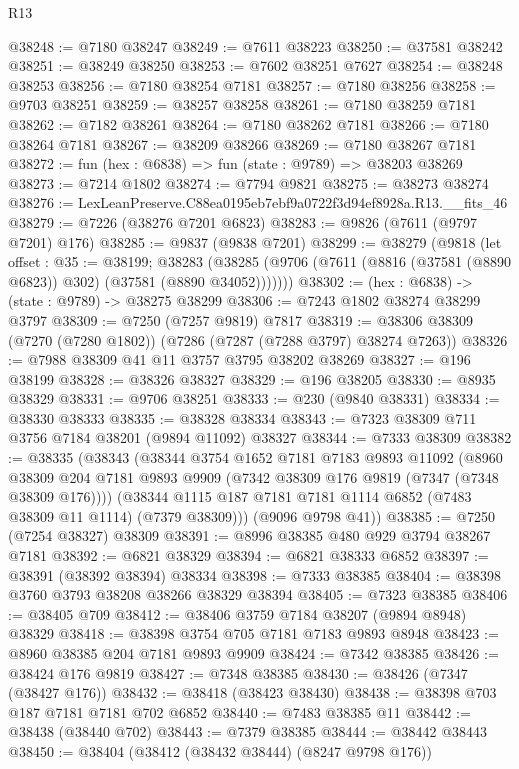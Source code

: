 \begin{lexlean}{R13}
\begin{coremodule}
@38248 := @7180 @38247
@38249 := @7611 @38223
@38250 := @37581 @38242
@38251 := @38249 @38250
@38253 := @7602 @38251 @7627
@38254 := @38248 @38253
@38256 := @7180 @38254 @7181
@38257 := @7180 @38256
@38258 := @9703 @38251
@38259 := @38257 @38258
@38261 := @7180 @38259 @7181
@38262 := @7182 @38261
@38264 := @7180 @38262 @7181
@38266 := @7180 @38264 @7181
@38267 := @38209 @38266
@38269 := @7180 @38267 @7181
@38272 := fun (hex : @6838) => fun (state : @9789) => @38203 @38269
@38273 := @7214 @1802
@38274 := @7794 @9821
@38275 := @38273 @38274
@38276 := LexLeanPreserve.C88ea0195eb7ebf9a0722f3d94ef8928a.R13.__fits_46
@38279 := @7226 (@38276 @7201 @6823)
@38283 := @9826 (@7611 (@9797 @7201) @176)
@38285 := @9837 (@9838 @7201)
@38299 := @38279
    (@9818
      (let offset : @35 := @38199;
      @38283 (@38285 (@9706 (@7611 (@8816 (@37581 (@8890 @6823)) @302) (@37581 (@8890 @34052)))))))
@38302 := (hex : @6838) -> (state : @9789) -> @38275 @38299
@38306 := @7243 @1802 @38274 @38299 @3797
@38309 := @7250 (@7257 @9819) @7817
@38319 := @38306 @38309 (@7270 (@7280 @1802)) (@7286 (@7287 (@7288 @3797) @38274 @7263))
@38326 := @7988 @38309 @41 @11 @3757 @3795 @38202 @38269
@38327 := @196 @38199
@38328 := @38326 @38327
@38329 := @196 @38205
@38330 := @8935 @38329
@38331 := @9706 @38251
@38333 := @230 (@9840 @38331)
@38334 := @38330 @38333
@38335 := @38328 @38334
@38343 := @7323 @38309 @711 @3756 @7184 @38201 (@9894 @11092) @38327
@38344 := @7333 @38309
@38382 := @38335
    (@38343
      (@38344
        @3754
        @1652
        @7181
        @7183
        @9893
        @11092
        (@8960 @38309 @204 @7181 @9893 @9909 (@7342 @38309 @176 @9819 (@7347 (@7348 @38309 @176))))
        (@38344 @1115 @187 @7181 @7181 @1114 @6852 (@7483 @38309 @11 @1114) (@7379 @38309)))
      (@9096 @9798 @41))
@38385 := @7250 (@7254 @38327) @38309
@38391 := @8996 @38385 @480 @929 @3794 @38267 @7181
@38392 := @6821 @38329
@38394 := @6821 @38333 @6852
@38397 := @38391 (@38392 @38394) @38334
@38398 := @7333 @38385
@38404 := @38398 @3760 @3793 @38208 @38266 @38329 @38394
@38405 := @7323 @38385
@38406 := @38405 @709
@38412 := @38406 @3759 @7184 @38207 (@9894 @8948) @38329
@38418 := @38398 @3754 @705 @7181 @7183 @9893 @8948
@38423 := @8960 @38385 @204 @7181 @9893 @9909
@38424 := @7342 @38385
@38426 := @38424 @176 @9819
@38427 := @7348 @38385
@38430 := @38426 (@7347 (@38427 @176))
@38432 := @38418 (@38423 @38430)
@38438 := @38398 @703 @187 @7181 @7181 @702 @6852
@38440 := @7483 @38385 @11
@38442 := @38438 (@38440 @702)
@38443 := @7379 @38385
@38444 := @38442 @38443
@38450 := @38404 (@38412 (@38432 @38444) (@8247 @9798 @176))

\end{coremodule}
\end{lexlean}
